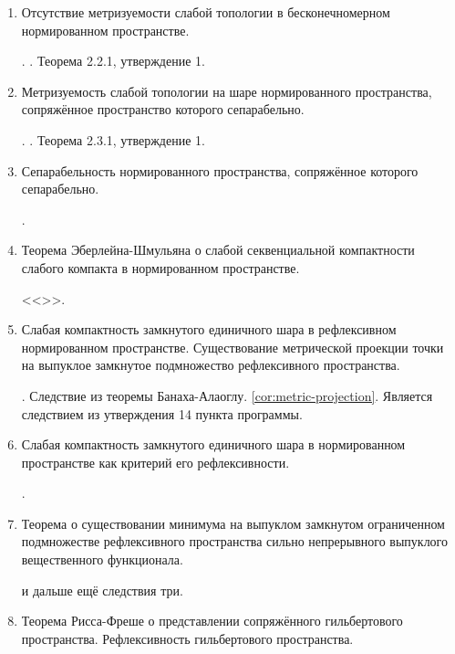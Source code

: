 \begin{enumerate}
     .  и следствие из него. . Следствия из теоремы Мазура.

    \item Отсутствие метризуемости слабой топологии в бесконечномерном нормированном пространстве.
    
    . . Теорема 2.2.1, утверждение 1.

    \item Метризуемость слабой топологии на шаре нормированного пространства, сопряжённое пространство которого сепарабельно.
    
    . . Теорема 2.3.1, утверждение 1.

    \item Сепарабельность нормированного пространства, сопряжённое которого сепарабельно.
    
    .

    \item Теорема Эберлейна-Шмульяна о слабой секвенциальной компактности слабого компакта в нормированном пространстве.
    
     <<>>.

    \item Слабая компактность замкнутого единичного шара в рефлексивном нормированном пространстве. Существование метрической проекции точки на выпуклое замкнутое подмножество рефлексивного пространства.
    
    . Следствие из теоремы Банаха-Алаоглу.
    \ref{cor:metric-projection}. Является следствием из утверждения 14 пункта программы.

    \item Слабая компактность замкнутого единичного шара в нормированном пространстве как критерий его рефлексивности.
    
    .

    \item Теорема о существовании минимума на выпуклом замкнутом ограниченном подмножестве рефлексивного пространства сильно непрерывного выпуклого вещественного функционала.
    
     и дальше ещё следствия три.

    \item Теорема Рисса-Фреше о представлении сопряжённого гильбертового пространства. Рефлексивность гильбертового пространства.
    

\end{enumerate}
